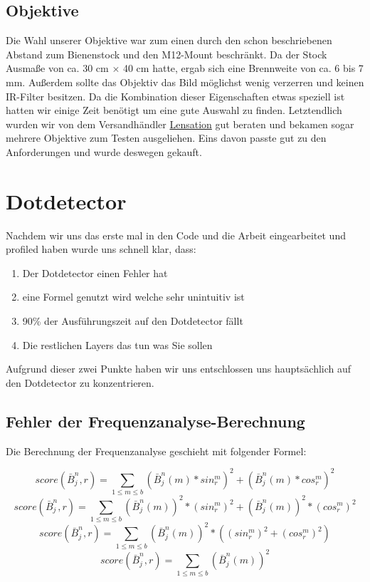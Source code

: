 \documentclass[11pt,a4paper]{article}
\begin{document}
\subsection{Objektive}%

Die Wahl unserer Objektive war zum einen durch den schon beschriebenen Abstand zum Bienenstock und den M12-Mount beschränkt.
Da der Stock Ausmaße von ca. 30 cm $\times$ 40 cm hatte, ergab sich eine Brennweite von ca. 6 bis 7 mm.
Außerdem sollte das Objektiv das Bild möglichst wenig verzerren und keinen IR-Filter besitzen.
Da die Kombination dieser Eigenschaften etwas speziell ist hatten wir einige Zeit benötigt um eine gute Auswahl zu finden.
Letztendlich wurden wir von dem Versandhändler \href{http://www.lensation.de/}{Lensation} gut beraten und bekamen sogar mehrere Objektive
zum Testen ausgeliehen.
Eins davon passte gut zu den Anforderungen und wurde deswegen gekauft.

\section{Dotdetector}%
Nachdem wir uns das erste mal in den Code und die Arbeit eingearbeitet und profiled haben wurde uns schnell klar, dass:
\begin{enumerate}
\item  Der Dotdetector einen Fehler hat
\item eine Formel genutzt wird welche sehr unintuitiv ist 
\item 90\% der Ausführungszeit auf den Dotdetector fällt
\item Die restlichen Layers das tun was Sie sollen\\
\end{enumerate}
Aufgrund dieser zwei Punkte haben wir uns entschlossen uns hauptsächlich auf den Dotdetector zu konzentrieren.

\subsection{Fehler der Frequenzanalyse-Berechnung}%
Die Berechnung der Frequenzanalyse geschieht mit folgender Formel:
\begin{center}
\begin{equation} 
score(\bar{B}_j^n, r) = \sum_{1\le m\le b} (\bar{B}_j^n(m) * sin_r^m)^2+(\bar{B}_j^n(m) * cos_r^m)^2
\end{equation}
\begin{equation} 
score(\bar{B}_j^n, r) = \sum_{1\le m\le b} (\bar{B}_j^n(m)) ^2 * (sin_r^m) ^2+(\bar{B}_j^n(m)) ^2 * (cos_r^m) ^2
\end{equation}
\begin{equation} 
score(\bar{B}_j^n, r) = \sum_{1\le m\le b} (\bar{B}_j^n(m)) ^2 * ((sin_r^m) ^2+ (cos_r^m) ^2)
\end{equation}
\begin{equation} 
score(\bar{B}_j^n, r) = \sum_{1\le m\le b} (\bar{B}_j^n(m)) ^2
\end{equation}
\end{center}
\end{document}
